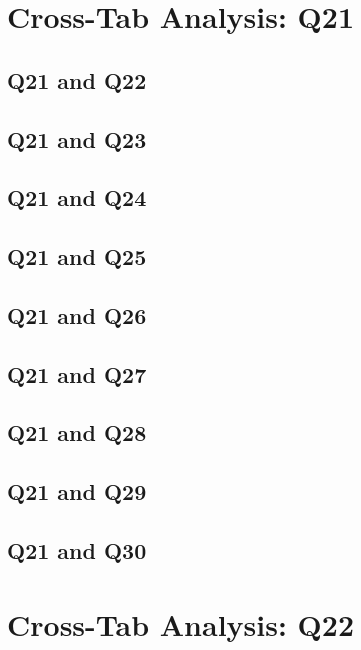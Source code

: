 \documentclass{report}
\begin{document}
\chapter{Cross-Tab Analysis: Q21}
\section{Q21 and Q22}


\clearpage
\section{Q21 and Q23}


\clearpage
\section{Q21 and Q24}


\clearpage
\section{Q21 and Q25}


\clearpage
\section{Q21 and Q26}


\clearpage
\section{Q21 and Q27}


\clearpage
\section{Q21 and Q28}


\clearpage
\section{Q21 and Q29}


\clearpage
\section{Q21 and Q30}


\chapter{Cross-Tab Analysis: Q22}
\end{document}
